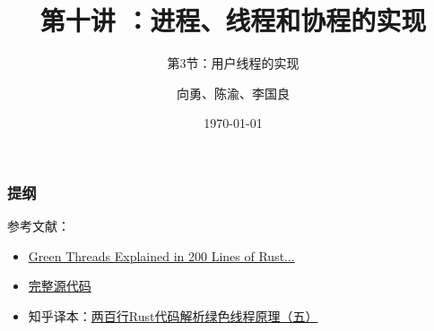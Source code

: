 



\title[第10讲]{第十讲 ：进程、线程和协程的实现} %
\subtitle{第3节：用户线程的实现}
\author{向勇、陈渝、李国良} %
\date{\today} %




\begin{frame}
\titlepage %
\end{frame}

\begin{frame}
\frametitle{提纲} %
\tableofcontents %
参考文献：
    \begin{itemize}
        \item \href{https://cfsamson.gitbook.io/green-threads-explained-in-200-lines-of-rust/}{Green Threads Explained in 200 Lines of Rust...}
        \item \href{https://github.com/cfsamson/example-greenthreads}{完整源代码}
        \item 知乎译本：\href{https://zhuanlan.zhihu.com/p/101168659}{两百行Rust代码解析绿色线程原理（五）}
    \end{itemize}
% 
\end{frame}
